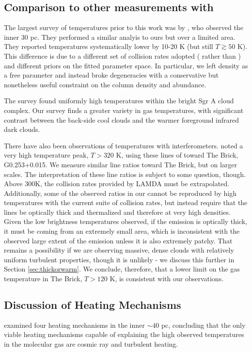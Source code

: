 \subsection{Comparison to other measurements with \para}
\label{sec:h2cocompare}
The largest survey of \para temperatures prior to this work was
by \citet{Ao2013a}, who observed the inner 30 pc.  They performed a similar
analyis to ours but over a limited area.  They reported temperatures
systematically lower by 10-20 K (but still $T\gtrsim50$ K).  This difference is
due to a different set of collision rates adopted (\citet{Wiesenfeld2013a}
rather than \citet{Green1991a}) and different priors on the fitted parameter
space.  In particular, we left density as a free parameter and instead broke
degeneracies with a conservative but nonetheless useful constraint on the
column density and abundance.

The \citet{Ao2013a} survey found uniformly high temperatures within the bright
Sgr A cloud complex.  Our survey finds a greater variety in gas temperatures,
with significant contrast between the back-side cool clouds and the warmer
foreground infrared dark clouds.

There have also been observations of \para temperatures with interferometers.
\citet{Johnston2014a} noted a very high temperature peak, $T>320$ K, using these
lines of \para toward The Brick, G0.253+0.015.  We measure similar line
ratios toward The Brick, but on larger scales.  The interpretation of these
line ratios is subject to some question, though.  Above 300K, the collision
rates provided by LAMDA \citep{Green1991a,Schoier2005a,Wiesenfeld2013a} must be
extrapolated.  Additionally, some of the observed ratios in our cannot be
reproduced by high temperatures with the current suite of collision rates, but
instead require that the lines be optically thick and thermalized and therefore
at very high densities.   Given the low brightness temperatures observed, if
the emission is optically thick, it must be coming from an extremely small
area, which is inconsistent with the observed large extent of the emission
unless it is also extremely patchy.  That remains a possibility if we are
observing massive, dense clouds with relatively uniform turbulent properties,
though it is unlikely - we discuss this further in Section
\ref{sec:thickorwarm}.  We conclude, therefore, that a lower limit on the
gas temperature in The Brick, $T>120$ K, is consistent with our observations.


\subsection{Discussion of Heating Mechanisms}
\citet{Ao2013a} examined four heating mechanisms in the inner $\sim 40$ pc,
concluding that the only viable heating mechanisms capable of explaining the
high observed temperatures in the molecular gas are cosmic ray and turbulent
heating.  

